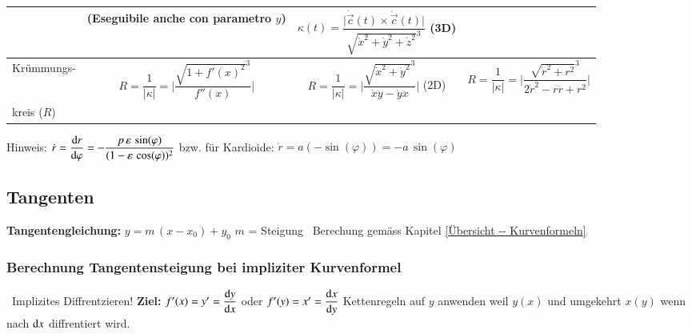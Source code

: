 {\begin{tabular}{| l | c | c | c |}
						& (Eseguibile anche con parametro $y$)																												& $\kappa(t) = \dfrac{\vert \dot{\vec{c}}(t) \times \ddot{\vec{c}}(t) \vert}{\sqrt{\dot{x}^2 + \dot{y}^2 + \dot{z}^2}^3}$ (3D)			& 																																											\\
	\hline
	Krümmungs- 			& $R = \dfrac{1}{\vert \kappa \vert} = \Bigg| \dfrac{\sqrt{1 + f'(x)^2}^3}{f''(x)} \Bigg|$ 						& $R = \dfrac{1}{\vert \kappa \vert} = \Bigg| \dfrac{\sqrt{\dot{x}^2 + \dot{y}^2}^3}{\dot{x} \ddot{y} - \dot{y} \ddot{x}} \Bigg|$ (2D)	& $R = \dfrac{1}{\vert \kappa \vert} = \Bigg| \dfrac{\sqrt{\dot{r}^2 + r^2}^3}{2 \dot{r}^2 - r \ddot{r} +r^2} \Bigg|$		 												\\
	kreis ($R$) 		& 																												& 																																		&																																											\\
	\hline		
\end{tabular}
}
\renewcommand{\arraystretch}{1}

\medskip
Hinweis: $\dot{r} = \dfrac{\mathop{} \! \mathrm{d} r}{\mathop{} \! \mathrm{d} \varphi} =- \dfrac{p \, \varepsilon \, \sin(\varphi)}{(1-\varepsilon \, \cos(\varphi))^2}$ \qquad bzw. für Kardioide: $\dot{r} = a(- \sin(\varphi)) = -a \, \sin(\varphi)$ \qquad {}


\columnbreak


\subsection{Tangenten}
\textbf{Tangentengleichung:} $y = m \, (x - x_0) + y_0$ \qquad $m$ = Steigung \textrightarrow\ Berechung gemäss Kapitel \ref{Übersicht -- Kurvenformeln}


\subsubsection{Berechnung Tangentensteigung bei impliziter Kurvenformel}

\textrightarrow\ Implizites Diffrentzieren! \qquad \textbf{Ziel:} $f'(x) = y' = \dfrac{\mathop{} \! \mathrm{d} y}{\mathop{} \! \mathrm{d} x}$ oder $f'(y) = x' = \dfrac{\mathop{} \! \mathrm{d} x}{\mathop{} \! \mathrm{d} y}$
\newline Kettenregeln auf $y$ anwenden weil $y(x)$ und umgekehrt $x(y)$ wenn nach $\mathop{} \! \mathrm{d} x$ diffrentiert wird.
\medskip

